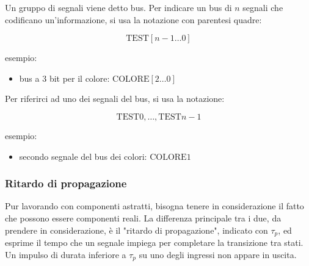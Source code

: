 \documentclass{article}
\begin{document}
Un gruppo di segnali viene detto bus.
Per indicare un bus di $n$ segnali che codificano un'informazione, si usa la notazione con parentesi quadre:

$$
\text{TEST}[n-1 \dots 0]
$$

\noindent
esempio:

\begin{itemize}
	\item bus a $3$ bit per il colore: $\text{COLORE}[2 \dots 0]$
\end{itemize}

\noindent
Per riferirci ad uno dei segnali del bus, si usa la notazione:

$$
\text{TEST}0, \dots, \text{TEST}n-1
$$

\noindent
esempio:

\begin{itemize}
	\item secondo segnale del bus dei colori: $\text{COLORE}1$
\end{itemize}

\subsubsection{Ritardo di propagazione}

Pur lavorando con componenti astratti, bisogna tenere in considerazione il fatto che possono essere componenti reali.
La differenza principale tra i due, da prendere in considerazione, è il "ritardo di propagazione", indicato con $\tau_p$, ed esprime il tempo che un segnale impiega per completare la transizione tra stati.
Un impulso di durata inferiore a $\tau_p$ su uno degli ingressi non appare in uscita.
\end{document}
